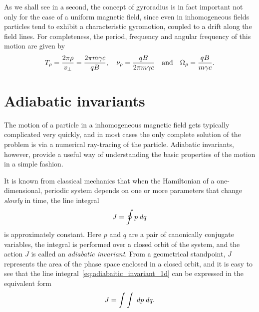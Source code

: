 As we shall see in a second, the concept of gyroradius is in fact important not
only for the case of a uniform magnetic field, since even in inhomogeneous fields
particles tend to exhibit a characteristic gyromotion, coupled to a drift along the
field lines. For completeness, the period, frequency and angular frequency of
this motion are given by
\begin{align}
  T_{\rho} = \frac{2\pi \rho}{v_\perp} = \frac{2\pi m \gamma c}{qB}, \quad
  \nu_{\rho} = \frac{qB}{2\pi m \gamma c} \quad\text{and}\quad
  \Omega_{\rho} = \frac{qB}{m \gamma c}.
\end{align}


\section{Adiabatic invariants}

The motion of a particle in a inhomogeneous magnetic field gets typically complicated
very quickly, and in most cases the only complete solution of the problem is via
a numerical ray-tracing of the particle. Adiabatic invariants, however, provide
a useful way of understanding the basic properties of the motion in a simple fashion.

It is known from classical mechanics that when the Hamiltonian of a one-dimensional,
periodic system depends on one or more parameters that change
\emph{slowly} in time, the line
integral
\begin{align}\label{eq:adiabaitic_invariant_1d}
  J = \oint p \;d{q}
\end{align}
is approximately constant. Here $p$ and $q$ are a pair of canonically conjugate
variables, the integral is performed over a closed orbit of the system, and
the action $J$ is called an \emph{adiabatic invariant}. From a geometrical standpoint,
$J$ represents the area of the phase space enclosed in a closed orbit, and it is
easy to see that the line integral~\eqref{eq:adiabaitic_invariant_1d} can be
expressed in the equivalent form
\begin{align*}
  J = \int\int \;d{p} \;d{q}.
\end{align*}

\begin{marginfigure}
  
  \caption{Trajectory of the periodic motion of a harmonic oscillator in the phase space.}
  \label{fig:adiabatic_invariant}
\end{marginfigure}

